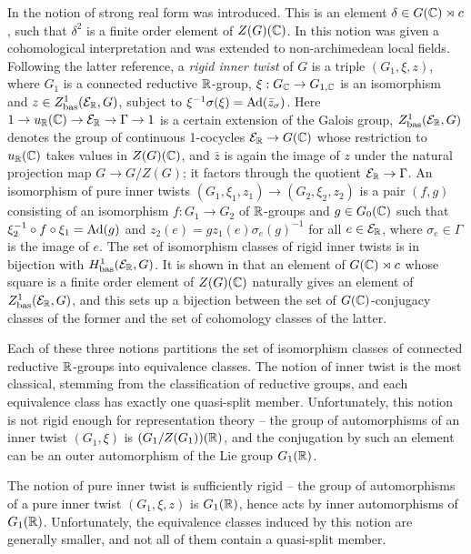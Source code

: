 \documentclass{article}
\theoremstyle{definition}
\numberwithin{equation}{section}
\renewcommand{\-}{\hyp{}}
\begin{document}
In \cite{ABV92} the notion of strong real form was introduced. This is an element $\delta \in G(\mathbb{C}) \rtimes c$, such that $\delta^2$ is a finite order element of $Z(G)(\mathbb{C})$. In \cite{KalRI} this notion was given a cohomological interpretation and was extended to non-archimedean local fields. Following the latter reference, a \emph{rigid inner twist} of $G$ is a triple $(G_1,\xi,z)$, where $G_1$ is a connected reductive $\mathbb{R}$-group, $\xi : G_{\mathbb{C}} \to G_{1,\mathbb{C}}$ is an isomorphism and $z \in Z^1_{\textrm{bas}}(\mathcal{E}_{\mathbb{R}},G)$, subject to $\xi^{-1}\sigma(\xi)=\textrm{Ad}(\bar z_\sigma)$. Here $1 \to u_{\mathbb{R}}(\mathbb{C}) \to \mathcal{E}_{\mathbb{R}} \to \Gamma \to 1$ is a certain extension of the Galois group, $Z^1_{\textrm{bas}}(\mathcal{E}_{\mathbb{R}},G)$ denotes the group of continuous 1-cocycles $\mathcal{E}_{\mathbb{R}} \to G(\mathbb{C})$ whose restriction to $u_{\mathbb{R}}(\mathbb{C})$ takes values in $Z(G)(\mathbb{C})$, and $\bar z$ is again the image of $z$ under the natural projection map $G \to G/Z(G)$; it factors through the quotient $\mathcal{E}_{\mathbb{R}} \to \Gamma$. An isomorphism of pure inner twists $(G_1,\xi_1,z_1) \to (G_2,\xi_2,z_2)$ is a pair $(f,g)$ consisting of an isomorphism $f : G_1 \to G_2$ of $\mathbb{R}$-groups and $g \in G_0(\mathbb{C})$ such that $\xi_2^{-1}\circ f \circ \xi_1=\textrm{Ad}(g)$ and $z_2(e)=gz_1(e)\sigma_e(g)^{-1}$ for all $e \in \mathcal{E}_{\mathbb{R}}$, where $\sigma_e \in \Gamma$ is the image of $e$. The set of isomorphism classes of rigid inner twists is in bijection with $H^1_{\textrm{bas}}(\mathcal{E}_{\mathbb{R}},G)$. It is shown in \cite[\S5.2]{KalRI} that an element of $G(\mathbb{C}) \rtimes c$ whose square is a finite order element of $Z(G)(\mathbb{C})$ naturally gives an element of $Z^1_{\textrm{bas}}(\mathcal{E}_{\mathbb{R}},G)$, and this sets up a bijection between the set of $G(\mathbb{C})$-conjugacy classes of the former and the set of cohomology classes of the latter.

Each of these three notions partitions the set of isomorphism classes of connected reductive $\mathbb{R}$-groups into equivalence classes. The notion of inner twist is the most classical, stemming from the classification of reductive groups, and each equivalence class has exactly one quasi-split member. Unfortunately, this notion is not rigid enough for representation theory -- the group of automorphisms of an inner twist $(G_1,\xi)$ is $(G_1/Z(G_1))(\mathbb{R})$, and the conjugation by such an element can be an outer automorphism of the Lie group $G_1(\mathbb{R})$.

The notion of pure inner twist is sufficiently rigid -- the group of automorphisms of a pure inner twist $(G_1,\xi,z)$ is $G_1(\mathbb{R})$, hence acts by inner automorphisms of $G_1(\mathbb{R})$. Unfortunately, the equivalence classes induced by this notion are generally smaller, and not all of them contain a quasi-split member.
\end{document}
